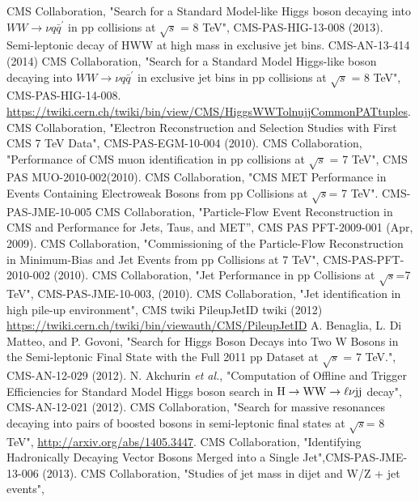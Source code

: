 \begin{thebibliography}{99}
CMS Collaboration, "Search for a Standard Model-like Higgs boson decaying into $WW\rightarrow \nu q\bar q^{\prime}$ in pp collisions at $\sqrt {s}$ = 8 TeV", CMS-PAS-HIG-13-008 (2013).
 Semi-leptonic decay of HWW at high mass in exclusive jet bins. CMS-AN-13-414 (2014)
 CMS Collaboration, "Search for a Standard Model Higgs-like boson decaying into $WW\rightarrow \nu q\bar q^{\prime}$ in exclusive jet bins in pp collisions at $\sqrt {s}$ = 8 TeV", CMS-PAS-HIG-14-008.
  {\url {https://twiki.cern.ch/twiki/bin/view/CMS/HiggsWWTolnujjCommonPATtuples}}.
 CMS Collaboration, "Electron Reconstruction and Selection Studies with First CMS 7
TeV Data", CMS-PAS-EGM-10-004 (2010).
 CMS Collaboration, "Performance of CMS muon identification in pp collisions at $\sqrt {s}$ = 7 TeV", CMS PAS MUO-2010-002(2010).
 CMS Collaboration, "CMS MET Performance in Events Containing Electroweak Bosons from pp Collisions at $\sqrt s$= 7 TeV". CMS-PAS-JME-10-005
 CMS Collaboration, "Particle-Flow Event Reconstruction in CMS and Performance for Jets, Taus, and MET”, CMS PAS PFT-2009-001 (Apr, 2009).
 CMS Collaboration, "Commissioning of the Particle-Flow Reconstruction in
Minimum-Bias and Jet Events from pp Collisions at 7 TeV", CMS-PAS-PFT-2010-002 (2010).
 CMS Collaboration, "Jet Performance in pp Collisions at $\sqrt s$=7 TeV", CMS-PAS-JME-10-003, (2010).
  CMS Collaboration, "Jet identification in high pile-up environment", CMS twiki
PileupJetID twiki (2012) {\url {https://twiki.cern.ch/twiki/bin/viewauth/CMS/PileupJetID}}
 A. Benaglia, L. Di Matteo, and P. Govoni, "Search for Higgs Boson Decays into Two W
Bosons in the Semi-leptonic Final State with the Full 2011 pp Dataset at $\sqrt{s}$ = 7 TeV.", CMS-AN-12-029 (2012).
 N. Akchurin {\it et al.}, "Computation of Offline and Trigger Efficiencies for Standard Model
Higgs boson search in $\rm H\rightarrow WW\rightarrow \ell\nu jj$ decay", CMS-AN-12-021 (2012).
 CMS Collaboration, "Search for massive resonances decaying into pairs of
boosted bosons in semi-leptonic final states at $\sqrt{s}$= 8 TeV", \url{http://arxiv.org/abs/1405.3447}.
 {CMS Collaboration}, "Identifying Hadronically Decaying Vector Bosons Merged into a
Single Jet",CMS-PAS-JME-13-006 (2013).
 {CMS Collaboration}, "Studies of jet mass in dijet and W/Z + jet events",

\end{thebibliography}
